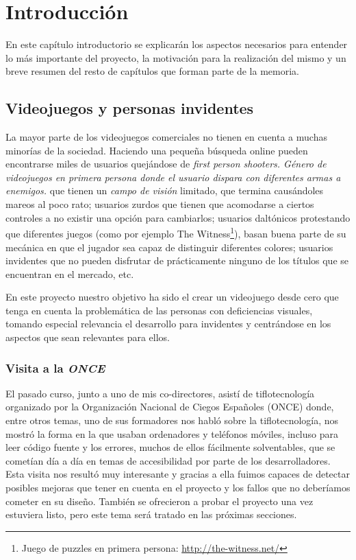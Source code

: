\chapter[Introdución]{Introducción}

En este capítulo introductorio se explicarán los aspectos necesarios para entender lo más importante del proyecto, la motivación para la realización del mismo y un breve resumen del resto de capítulos que forman parte de la memoria.

\section{Videojuegos y personas invidentes}
La mayor parte de los videojuegos comerciales no tienen en cuenta a muchas minorías de la sociedad. Haciendo una pequeña búsqueda online pueden encontrarse miles de usuarios quejándose de \textit{first person shooters. Género de videojuegos en primera persona donde el usuario dispara con diferentes armas a enemigos.} que tienen un \textit{campo de visión} limitado, que termina causándoles mareos al poco rato; usuarios zurdos que tienen que acomodarse a ciertos controles a no existir una opción para cambiarlos; usuarios daltónicos protestando que diferentes juegos (como por ejemplo The Witness\footnote{Juego de puzzles en primera persona: \url{http://the-witness.net/}}), basan buena parte de su mecánica en que el jugador sea capaz de distinguir diferentes colores; usuarios invidentes que no pueden disfrutar de prácticamente ninguno de los títulos que se encuentran en el mercado, etc.

En este proyecto nuestro objetivo ha sido el crear un videojuego desde cero que tenga en cuenta la problemática de las personas con deficiencias visuales, tomando especial relevancia el desarrollo para invidentes y centrándose en los aspectos que sean relevantes para ellos.

\subsection{Visita a la \textit{ONCE}}
El pasado curso, junto a uno de mis co-directores, asistí de tiflotecnología organizado por la Organización Nacional de Ciegos Españoles (ONCE) donde, entre otros temas, uno de sus formadores nos habló sobre la tiflotecnología, nos mostró la forma en la que usaban ordenadores y teléfonos móviles, incluso para leer código fuente y los errores, muchos de ellos fácilmente solventables, que se cometían día a día en temas de accesibilidad por parte de los desarrolladores. Esta visita nos resultó muy interesante y gracias a ella fuimos capaces de detectar posibles mejoras que tener en cuenta en el proyecto y los fallos que no deberíamos cometer en su diseño. También se ofrecieron a probar el proyecto una vez estuviera listo, pero este tema será tratado en las próximas secciones.

